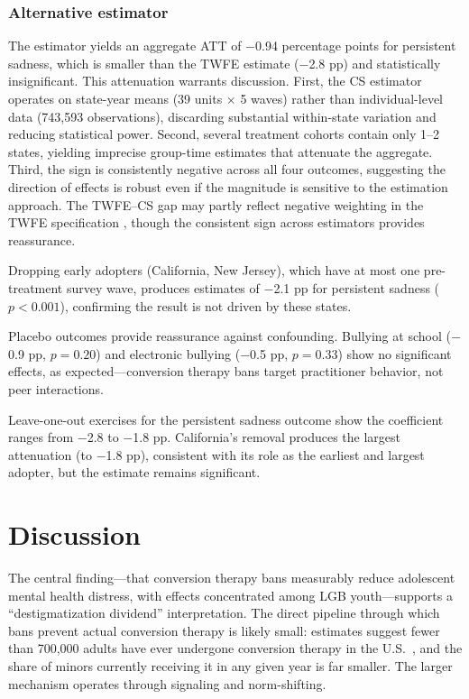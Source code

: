 \documentclass[12pt]{article}
\begin{document}
\subsubsection*{Alternative estimator} The \citet{callaway2021} estimator yields an aggregate ATT of $-$0.94 percentage points for persistent sadness, which is smaller than the TWFE estimate ($-$2.8 pp) and statistically insignificant. This attenuation warrants discussion. First, the CS estimator operates on state-year means (39 units $\times$ 5 waves) rather than individual-level data (743,593 observations), discarding substantial within-state variation and reducing statistical power. Second, several treatment cohorts contain only 1--2 states, yielding imprecise group-time estimates that attenuate the aggregate. Third, the sign is consistently negative across all four outcomes, suggesting the direction of effects is robust even if the magnitude is sensitive to the estimation approach. The TWFE--CS gap may partly reflect negative weighting in the TWFE specification \citep{sun2021}, though the consistent sign across estimators provides reassurance.

Dropping early adopters (California, New Jersey), which have at most one pre-treatment survey wave, produces estimates of $-$2.1 pp for persistent sadness ($p < 0.001$), confirming the result is not driven by these states.

Placebo outcomes provide reassurance against confounding. Bullying at school ($-$0.9 pp, $p = 0.20$) and electronic bullying ($-$0.5 pp, $p = 0.33$) show no significant effects, as expected---conversion therapy bans target practitioner behavior, not peer interactions.

Leave-one-out exercises for the persistent sadness outcome show the coefficient ranges from $-$2.8 to $-$1.8 pp. California's removal produces the largest attenuation (to $-$1.8 pp), consistent with its role as the earliest and largest adopter, but the estimate remains significant.



\section{Discussion}

The central finding---that conversion therapy bans measurably reduce adolescent mental health distress, with effects concentrated among LGB youth---supports a ``destigmatization dividend'' interpretation. The direct pipeline through which bans prevent actual conversion therapy is likely small: estimates suggest fewer than 700,000 adults have ever undergone conversion therapy in the U.S.\ \citep{blosnich2018,conron2020}, and the share of minors currently receiving it in any given year is far smaller. The larger mechanism operates through signaling and norm-shifting.
\end{document}
